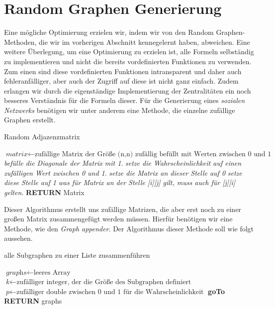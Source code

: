 \section{Random Graphen Generierung}
Eine mögliche Optimierung erzielen wir, indem wir von den Random Graphen-Methoden, die wir im vorherigen Abschnitt kennegelernt haben, abweichen. Eine weitere Überlegung, um eine Optimierung zu erzielen ist, alle Formeln selbständig zu implementieren und nicht die bereits vordefinierten Funktionen zu verwenden. Zum einen sind diese vordefinierten Funktionen intransparent und daher auch fehleranfälliger, aber auch der Zugriff auf diese ist nicht ganz einfach. Zudem erlangen wir durch die eigenständige Implementierung der Zentralitäten ein noch besseres Verständnis für die Formeln dieser.
Für die Generierung eines \textit{sozialen Netzwerks} benötigen wir unter anderem eine Methode, die einzelne zufällige Graphen erstellt. 

\begin{algorithm}
\caption{Random Adjazenzmatrix}\label{randomAdjacency}
\begin{algorithmic}[1]
\State $\textit{matrix} \gets \text{zufällige Matrix der Größe (n,n) zufällig befüllt mit Werten zwischen 0 und 1}$
\State \textit{befülle die Diagonale der Matrix mit 1}.
\EndFor
{}
\State \textit{setze die Wahrscheinlichkeit auf einen zufälligen Wert zwischen 0 und 1}.
\State \textit{setze die Matrix an dieser Stelle auf 0}
\Else 
\State \textit{setze diese Stelle auf 1}
\EndIf
\EndFor
{}
\State \textit{was für Matrix an der Stelle [i][j] gilt, muss auch für [j][i] gelten}.
\State \textbf{RETURN} Matrix
\EndFor
\EndProcedure
\end{algorithmic}
\end{algorithm}

Dieser Algorithmus erstellt uns zufällige Matrizen, die aber erst noch zu einer großen Matrix zusammengefügt werden müssen. Hierfür benötigen wir eine Methode, wie den \textit{Graph appender}. Der Algorithmus dieser Methode soll wie folgt aussehen. 

\begin{algorithm}
\caption{alle Subgraphen zu einer Liste zusammenführen}\label{GraphAppender}
\begin{algorithmic}[1]
\State $\textit{graphs} \gets \text{leeres Array}$
\State $\textit{k} \gets \text{zufälliger integer, der die Größe des Subgraphen definiert}$
\State $\textit{p} \gets \text{zufälliger double zwischen 0 und 1 für die Wahrscheinlichkeit}$
\State \textbf{goTo} 
\State {} \textbf{RETURN} graphs 
\EndFor
\EndProcedure
\end{algorithmic}
\end{algorithm}

